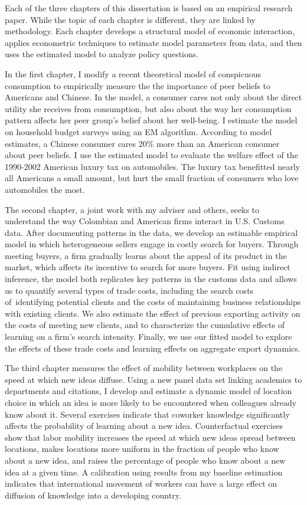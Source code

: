 
Each of the three chapters of this dissertation is based on an empirical research paper.  While the topic of each chapter is different, they are linked by methodology.  Each chapter develops a structural model of economic interaction, applies econometric techniques to estimate model parameters from data, and then uses the estimated model to analyze policy questions.

In the first chapter, I modify a recent theoretical model of conspicuous consumption to empirically measure the the importance of peer beliefs to Americans and Chinese.  In the model, a consumer cares not only about the direct utility she receives from consumption, but also about the way her consumption pattern affects her peer group's belief about her well-being.  I estimate the model on household budget surveys using an EM algorithm. According to model estimates, a Chinese consumer cares 20\% more than an American consumer about peer beliefs.  I use the estimated model to evaluate the welfare effect of the 1990-2002 American luxury tax on automobiles.  The luxury tax benefitted nearly all Americans a small amount, but hurt the small fraction of consumers who love automobiles the most.

The second chapter, a joint work with my adviser and others, seeks to understand the way Colombian and American firms interact in U.S. Customs data.  After documenting patterns in the data, we develop an estimable empirical model in which heterogeneous sellers engage in costly search for buyers.  Through meeting buyers, a firm gradually learns about the appeal of its product in the market, which affects its incentive to search for more buyers.  Fit using indirect inference, the model both replicates key patterns in the customs data and allows us to quantify several types of trade costs, including the search costs of\ identifying potential clients and the costs of maintaining business relationships with existing clients. We also estimate the effect of previous exporting activity on the costs of meeting new clients, and to characterize the cumulative effects of learning on a firm's search intensity. Finally, we use our fitted model to explore the effects of these trade costs and learning effects on aggregate export dynamics.

The third chapter measures the effect of mobility between workplaces on the speed at which new ideas diffuse.  Using a new panel data set linking academics to departments and citations, I develop and estimate a dynamic model of location choice in which an idea is more likely to be encountered when colleagues already know about it.  Several exercises indicate that coworker knowledge significantly affects the probability of learning about a new idea.  Counterfactual exercises show that labor mobility increases the speed at which new ideas spread between locations, makes locations more uniform in the fraction of people who know about a new idea, and raises the percentage of people who know about a new idea at a given time.  A calibration using results from my baseline estimation indicates that international movement of workers can have a large effect on diffusion of knowledge into a developing country.

